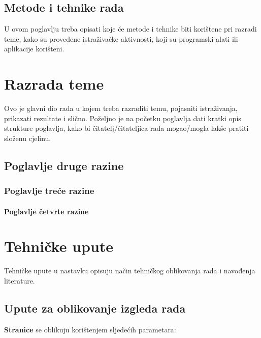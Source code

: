 \documentclass{foi}
\begin{document}
\section{Metode i tehnike rada}

U ovom poglavlju treba opisati koje će metode i tehnike biti korištene pri razradi teme, kako su provedene istraživačke aktivnosti, koji su programski alati ili aplikacije korišteni.

\chapter{Razrada teme}

Ovo je glavni dio rada u kojem treba razraditi temu, pojasniti istraživanja, prikazati rezultate i slično. Poželjno je na početku poglavlja dati kratki opis strukture poglavlja, kako bi čitatelj/čitateljica rada mogao/mogla lakše pratiti složenu cjelinu.

\section{Poglavlje druge razine }

\lipsum[1]

\subsection{Poglavlje treće razine}

\lipsum[2]

\subsubsection{Poglavlje četvrte razine}

\lipsum[3-4]

\chapter{Tehničke upute}

Tehničke upute u nastavku opisuju način tehničkog oblikovanja rada i navođenja literature.

\section{Upute za oblikovanje izgleda rada}

\begin{flushleft}\textbf{Stranice} se oblikuju korištenjem sljedećih parametara:\end{flushleft}
\end{document}
